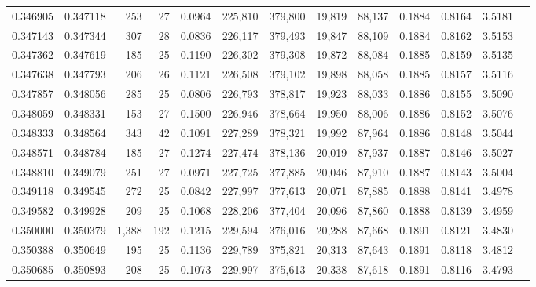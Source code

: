 \begin{tabular}{rrrrrrrrrrrrr}
0.346905 & 0.347118 &    253 &    27 &                                     0.0964 & 225,810 & 379,800 &  19,819 &  88,137 & 0.1884 & 0.8164 & 3.5181 \\
0.347143 & 0.347344 &    307 &    28 &                                     0.0836 & 226,117 & 379,493 &  19,847 &  88,109 & 0.1884 & 0.8162 & 3.5153 \\
0.347362 & 0.347619 &    185 &    25 &                                     0.1190 & 226,302 & 379,308 &  19,872 &  88,084 & 0.1885 & 0.8159 & 3.5135 \\
0.347638 & 0.347793 &    206 &    26 &                                     0.1121 & 226,508 & 379,102 &  19,898 &  88,058 & 0.1885 & 0.8157 & 3.5116 \\
0.347857 & 0.348056 &    285 &    25 &                                     0.0806 & 226,793 & 378,817 &  19,923 &  88,033 & 0.1886 & 0.8155 & 3.5090 \\
0.348059 & 0.348331 &    153 &    27 &                                     0.1500 & 226,946 & 378,664 &  19,950 &  88,006 & 0.1886 & 0.8152 & 3.5076 \\
0.348333 & 0.348564 &    343 &    42 &                                     0.1091 & 227,289 & 378,321 &  19,992 &  87,964 & 0.1886 & 0.8148 & 3.5044 \\
0.348571 & 0.348784 &    185 &    27 &                                     0.1274 & 227,474 & 378,136 &  20,019 &  87,937 & 0.1887 & 0.8146 & 3.5027 \\
0.348810 & 0.349079 &    251 &    27 &                                     0.0971 & 227,725 & 377,885 &  20,046 &  87,910 & 0.1887 & 0.8143 & 3.5004 \\
0.349118 & 0.349545 &    272 &    25 &                                     0.0842 & 227,997 & 377,613 &  20,071 &  87,885 & 0.1888 & 0.8141 & 3.4978 \\
0.349582 & 0.349928 &    209 &    25 &                                     0.1068 & 228,206 & 377,404 &  20,096 &  87,860 & 0.1888 & 0.8139 & 3.4959 \\
0.350000 & 0.350379 &  1,388 &   192 &                                     0.1215 & 229,594 & 376,016 &  20,288 &  87,668 & 0.1891 & 0.8121 & 3.4830 \\
0.350388 & 0.350649 &    195 &    25 &                                     0.1136 & 229,789 & 375,821 &  20,313 &  87,643 & 0.1891 & 0.8118 & 3.4812 \\
0.350685 & 0.350893 &    208 &    25 &                                     0.1073 & 229,997 & 375,613 &  20,338 &  87,618 & 0.1891 & 0.8116 & 3.4793 \\

\end{tabular}
